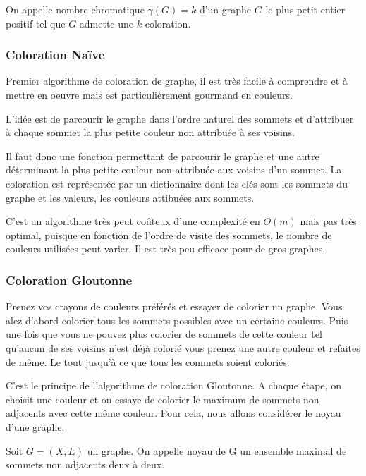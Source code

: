 \begin{definition}
    On appelle nombre chromatique $\gamma(G) = k$ d'un graphe $G$ le plus petit entier positif tel que $G$ admette une $k$-coloration.
\end{definition}

\subsubsection{Coloration Naïve}

Premier algorithme de coloration de graphe, il est très facile à comprendre et à mettre en oeuvre mais 
est particulièrement gourmand en couleurs. 

L'idée est de parcourir le graphe dans l'ordre naturel des sommets et d'attribuer à chaque sommet 
la plus petite couleur non attribuée à ses voisins. 

Il faut donc une fonction permettant de parcourir le graphe et une autre déterminant 
la plus petite couleur non attribuée aux voisins d'un sommet. 
La coloration est représentée par un dictionnaire dont les clés sont les sommets 
du graphe et les valeurs, les couleurs attibuées aux sommets. 

C'est un algorithme très peut coûteux d'une complexité en $\Theta(m)$ mais pas très optimal, 
puisque en fonction de l'ordre de visite des sommets, le nombre de couleurs utilisées peut 
varier. Il est très peu efficace pour de gros graphes. 

\subsubsection{Coloration Gloutonne}

Prenez vos crayons de couleurs préférés et essayer de colorier un graphe. 
Vous alez d'abord colorier tous les sommets possibles avec un certaine couleurs. 
Puis une fois que vous ne pouvez plus colorier de sommets de cette couleur tel qu'aucun 
de ses voisins n'est déjà colorié vous prenez une autre couleur et refaites de même. 
Le tout jusqu'à ce que tous les commets soient coloriés. 

C'est le principe de l'algorithme de coloration Gloutonne. A chaque étape, on choisit une 
couleur et on essaye de colorier le maximum de sommets non adjacents avec cette même couleur. 
Pour cela, nous allons considérer le noyau d'une graphe. 

\begin{definition}[Noyau]
    Soit $G = (X,E)$ un graphe. On appelle noyau de G un ensemble maximal de sommets 
    non adjacents deux à deux. 
\end{definition}

